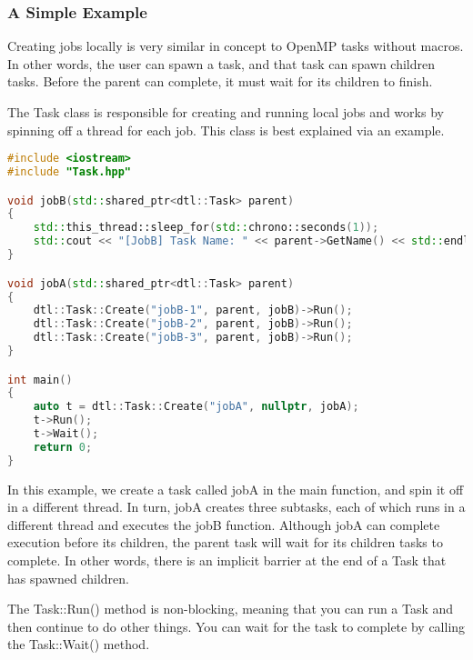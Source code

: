\documentclass[11pt]{article}
\begin{document}
            \subsubsection{A Simple Example}
                Creating jobs locally is very similar in concept to OpenMP tasks without macros. In other words,
                the user can spawn a task, and that task can spawn children tasks. Before the parent can complete,
                it must wait for its children to finish. 
                
                The Task class is responsible for creating and running local jobs and works by spinning off
                a thread for each job. This class is best explained via an example.
                
                \pagebreak
                
                \begin{lstlisting}[language=C++]
#include <iostream>
#include "Task.hpp"

void jobB(std::shared_ptr<dtl::Task> parent) 
{
    std::this_thread::sleep_for(std::chrono::seconds(1));
    std::cout << "[JobB] Task Name: " << parent->GetName() << std::endl; 
}

void jobA(std::shared_ptr<dtl::Task> parent)
{
    dtl::Task::Create("jobB-1", parent, jobB)->Run();
    dtl::Task::Create("jobB-2", parent, jobB)->Run();
    dtl::Task::Create("jobB-3", parent, jobB)->Run();
}

int main()
{
    auto t = dtl::Task::Create("jobA", nullptr, jobA);
    t->Run();
    t->Wait();
    return 0;
}
                \end{lstlisting}
                
                In this example, we create a task called jobA in the main function, and spin it off in a different
                thread. In turn, jobA creates three subtasks, each of which runs in a different thread and
                executes the jobB function. Although jobA can complete execution before its children, the parent
                task will wait for its children tasks to complete. In other words, there is an implicit barrier
                at the end of a Task that has spawned children. 
                
                The Task::Run() method is non-blocking, meaning that you can run a Task and then continue to do
                other things. You can wait for the task to complete by calling the Task::Wait() method.
                
\end{document}
